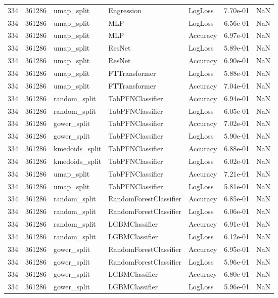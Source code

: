 \begin{tabular}{rrlllrr}
334 & 361286 & umap\_split & Engression & LogLoss & 7.70e-01 & NaN \\
334 & 361286 & umap\_split & MLP & LogLoss & 6.56e-01 & NaN \\
334 & 361286 & umap\_split & MLP & Accuracy & 6.97e-01 & NaN \\
334 & 361286 & umap\_split & ResNet & LogLoss & 5.89e-01 & NaN \\
334 & 361286 & umap\_split & ResNet & Accuracy & 6.90e-01 & NaN \\
334 & 361286 & umap\_split & FTTransformer & LogLoss & 5.88e-01 & NaN \\
334 & 361286 & umap\_split & FTTransformer & Accuracy & 7.04e-01 & NaN \\
334 & 361286 & random\_split & TabPFNClassifier & Accuracy & 6.94e-01 & NaN \\
334 & 361286 & random\_split & TabPFNClassifier & LogLoss & 6.05e-01 & NaN \\
334 & 361286 & gower\_split & TabPFNClassifier & Accuracy & 7.02e-01 & NaN \\
334 & 361286 & gower\_split & TabPFNClassifier & LogLoss & 5.90e-01 & NaN \\
334 & 361286 & kmedoids\_split & TabPFNClassifier & Accuracy & 6.88e-01 & NaN \\
334 & 361286 & kmedoids\_split & TabPFNClassifier & LogLoss & 6.02e-01 & NaN \\
334 & 361286 & umap\_split & TabPFNClassifier & Accuracy & 7.21e-01 & NaN \\
334 & 361286 & umap\_split & TabPFNClassifier & LogLoss & 5.81e-01 & NaN \\
334 & 361286 & random\_split & RandomForestClassifier & Accuracy & 6.85e-01 & NaN \\
334 & 361286 & random\_split & RandomForestClassifier & LogLoss & 6.06e-01 & NaN \\
334 & 361286 & random\_split & LGBMClassifier & Accuracy & 6.91e-01 & NaN \\
334 & 361286 & random\_split & LGBMClassifier & LogLoss & 6.12e-01 & NaN \\
334 & 361286 & gower\_split & RandomForestClassifier & Accuracy & 6.95e-01 & NaN \\
334 & 361286 & gower\_split & RandomForestClassifier & LogLoss & 5.96e-01 & NaN \\
334 & 361286 & gower\_split & LGBMClassifier & Accuracy & 6.80e-01 & NaN \\
334 & 361286 & gower\_split & LGBMClassifier & LogLoss & 5.96e-01 & NaN \\

\end{tabular}
